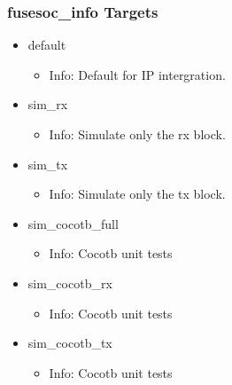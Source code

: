 \subsubsection{fusesoc\_info Targets}
\begin{itemize}
\item default
	\begin{itemize}
	\item[$\space$] Info: Default for IP intergration.
	\end{itemize}
\item sim\_rx
	\begin{itemize}
	\item[$\space$] Info: Simulate only the rx block.
	\end{itemize}
\item sim\_tx
	\begin{itemize}
	\item[$\space$] Info: Simulate only the tx block.
	\end{itemize}
\item sim\_cocotb\_full
	\begin{itemize}
	\item[$\space$] Info: Cocotb unit tests
	\end{itemize}
\item sim\_cocotb\_rx
	\begin{itemize}
	\item[$\space$] Info: Cocotb unit tests
	\end{itemize}
\item sim\_cocotb\_tx
	\begin{itemize}
	\item[$\space$] Info: Cocotb unit tests
	\end{itemize}
\end{itemize}
